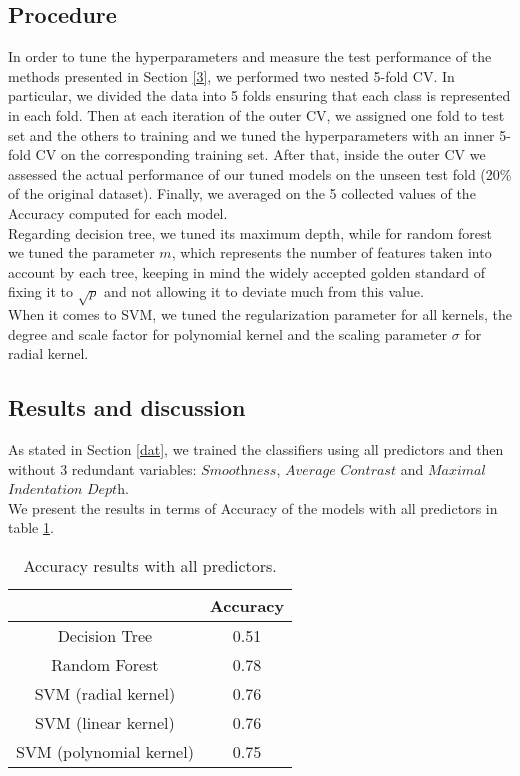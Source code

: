 \documentclass{article}
\begin{document}
\subsection{Procedure}
In order to tune the hyperparameters and measure the test performance of the methods presented in Section \ref{3}, we performed two nested 5-fold CV. 
In particular, we divided the data into 5 folds ensuring that each class is represented in each fold. Then at each iteration of the outer CV, we assigned one fold to test set and the others to training and we tuned the hyperparameters with an inner 5-fold CV on the corresponding training set. After that, inside the outer CV we assessed the actual performance of our tuned models on the unseen test fold (20\% of the original dataset). Finally, we averaged on the 5 collected values of the Accuracy computed for each model.
\\Regarding decision tree, we tuned its maximum depth, while for random forest we tuned the parameter $m$, which represents the number of features taken into account by each tree, keeping in mind the widely accepted golden standard of fixing it to $\sqrt{p}$ and not allowing it to deviate much from this value.
\\When it comes to SVM, we tuned the regularization parameter for all kernels, the degree and scale factor for polynomial kernel and the scaling parameter $\sigma$ for radial kernel.

\subsection{Results and discussion}
As stated in Section \ref{dat}, we trained the classifiers using all predictors and then without $3$ redundant variables: $\textit{Smoothness}$, $\textit{Average Contrast}$ and $\textit{Maximal}$ $\textit{Indentation Depth}$. 
\\We present the results in terms of Accuracy of the models with all predictors in table \ref{table1}. 
\begin{table}[ht]
 \centering
\begin{tabular}{ |c|c|} \hline
 & Accuracy \\
\hline
Decision Tree & 0.51 \\ 
\hline
 Random Forest & 0.78  \\ 
\hline
 SVM (radial kernel) & 0.76 \\ 
\hline
 SVM (linear kernel) & 0.76 \\ 
\hline
 SVM (polynomial kernel) & 0.75 \\ 
\hline
\end{tabular}
\caption{Accuracy results with all predictors.}\label{table1}
\end{table}
\end{document}
